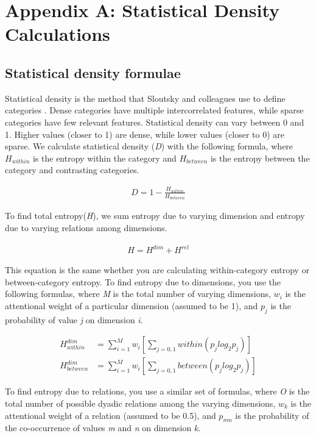 \documentclass[../dissertation.tex]{subfiles}
\begin{document}
\section{Appendix A: Statistical Density Calculations} \label{appendixA}

\subsection{Statistical density formulae}

Statistical density is the method that Sloutsky and colleagues use to define categories \citep{Sloutsky2010}. Dense categories have multiple intercorrelated features, while sparse categories have few relevant features. Statistical density can vary between 0 and 1. Higher values (closer to 1) are dense, while lower values (closer to 0) are sparse. We calculate statistical density (\textit{D}) with the following formula, where $H_{within}$ is the entropy within the category and $H_{between}$ is the entropy between the category and contrasting categories.

\begin{align*}
D = 1 - \frac{H_{within}}{H_{between}}
\end{align*}

To find total entropy(\textit{H}), we sum entropy due to varying dimension and entropy due to varying relations among dimensions.

\begin{align*}
H = H^{dim} + H^{rel}
\end{align*}

This equation is the same whether you are calculating within-category entropy or between-category entropy. To find entropy due to dimensions, you use the following formulas, where \textit{M} is the total number of varying dimensions, $w_{i}$ is the attentional weight of a particular dimension (assumed to be 1), and $p_{j}$ is the probability of value \textit{j} on dimension \textit{i}.

\begin{align*}
H^{dim}_{within} &= \sum_{i=1}^{M}w_{i}[\sum_{j=0,1}within(p_{j}log_{2}p_{j})]\\
H^{dim}_{between} &= \sum_{i=1}^{M}w_{i}[\sum_{j=0,1}between(p_{j}log_{2}p_{j})]
\end{align*}

To find entropy due to relations, you use a similar set of formulas, where \textit{O} is the total number of possible dyadic relations among the varying dimensions, $w_{k}$ is the attentional weight of a relation (assumed to be 0.5), and $p_{mn}$ is the probability of the co-occurrence of values \textit{m} and \textit{n} on dimension \textit{k}.
\end{document}
